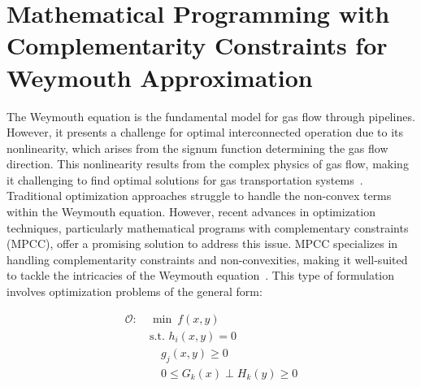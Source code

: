 \section{Mathematical Programming with Complementarity Constraints for Weymouth Approximation} \label{sec:mpcc}

The Weymouth equation is the fundamental model for gas flow through pipelines. However, it presents a challenge for optimal interconnected operation due to its nonlinearity, which arises from the signum function determining the gas flow direction. This nonlinearity results from the complex physics of gas flow, making it challenging to find optimal solutions for gas transportation systems~\citep{weymouth_nonconvex}. Traditional optimization approaches struggle to handle the non-convex terms within the Weymouth equation. However, recent advances in optimization techniques, particularly mathematical programs with complementary constraints (MPCC), offer a promising solution to address this issue. MPCC specializes in handling complementarity constraints and non-convexities, making it well-suited to tackle the intricacies of the Weymouth equation~\citep{baumrucker_renfro_biegler_2008}. This type of formulation involves optimization problems of the general form:


\begin{subequations}
\begin{alignat}{4}
\mathcal{O}: \ &\min \ f(x, y) \\
&\text{s.t. } h_i(x, y) = 0 \\
&\quad g_j(x, y) \geq 0 \\
&\quad 0 \leq G_k(x) \perp H_k(y) \geq 0 \label{eq:complementarity}
\end{alignat}
\end{subequations}

